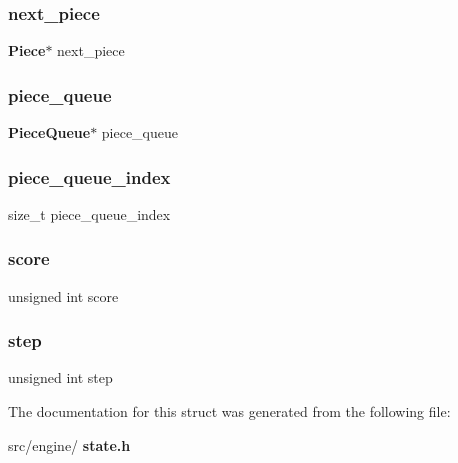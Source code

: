 \subsubsection{next\+\_\+piece}
{\footnotesize\ttfamily \textbf{ Piece}$\ast$ next\+\_\+piece}

\mbox{\label{structState_a03cfc54cf110d49f618178d7c6696977}} 
\subsubsection{piece\+\_\+queue}
{\footnotesize\ttfamily \textbf{ Piece\+Queue}$\ast$ piece\+\_\+queue}

\mbox{\label{structState_a00d61210bd561ca12fe3cbea231802bf}} 
\subsubsection{piece\+\_\+queue\+\_\+index}
{\footnotesize\ttfamily size\+\_\+t piece\+\_\+queue\+\_\+index}

\mbox{\label{structState_a9dffb288f0f2281a0b9abbd8efaa5a18}} 
\subsubsection{score}
{\footnotesize\ttfamily unsigned int score}

\mbox{\label{structState_aff48805b5e25bfa4af93ea7e44481596}} 
\subsubsection{step}
{\footnotesize\ttfamily unsigned int step}



The documentation for this struct was generated from the following file\+:\begin{DoxyCompactItemize}
\item 
src/engine/\textbf{ state.\+h}\end{DoxyCompactItemize}
